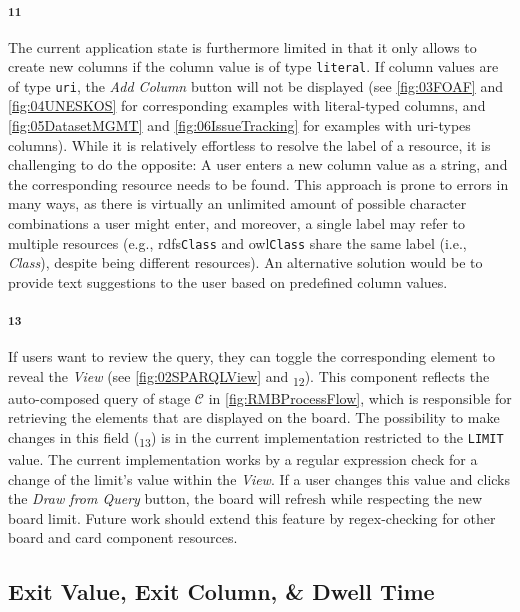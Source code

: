 \noindent \paragraph{\textsubscript{11}} The current application state is furthermore limited in that it only allows to create new columns if the column value is of type \texttt{literal}. If column values are of type \texttt{uri}, the \textit{Add Column} button will not be displayed (see \autoref{fig:03FOAF} and \autoref{fig:04UNESKOS} for corresponding examples with literal-typed columns, and \autoref{fig:05DatasetMGMT} and \autoref{fig:06IssueTracking} for examples with uri-types columns). While it is relatively effortless to resolve the label of a resource, it is challenging to do the opposite: A user enters a new column value as a string, and the corresponding resource needs to be found. This approach is prone to errors in many ways, as there is virtually an unlimited amount of possible character combinations a user might enter, and moreover, a single label may refer to multiple resources (e.g., \acrshort{rdfs}\texttt{Class} and \acrshort{owl}\texttt{Class} share the same label (i.e., \textit{Class}), despite being different resources). An alternative solution would be to provide text suggestions to the user based on predefined column values.

\noindent \paragraph{\textsubscript{13}} If users want to review the  query, they can toggle the corresponding  element to reveal the \textit{ View} (see \autoref{fig:02SPARQLView} and \textsubscript{12}). This component reflects the auto-composed query of stage {\small \hyperref[ssec:QS-C]{\(\mathcal{C}\)}} in \autoref{fig:RMBProcessFlow}, which is responsible for retrieving the elements that are displayed on the board. The possibility to make changes in this field (\textsubscript{13}) is in the current implementation restricted to the  \texttt{LIMIT} value. The current implementation works by a regular expression check for a change of the limit’s value within the \textit{ View}. If a user changes this value and clicks the \textit{Draw from Query} button, the board will refresh while respecting the new board limit. Future work should extend this feature by regex-checking for other board and card component resources.


\subsection*{Exit Value, Exit Column, \& Dwell Time}

